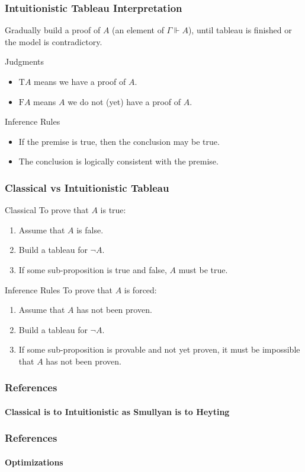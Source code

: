 \documentclass[mathserif]{beamer}
\def\T{\textrm{T}}
\def\F{\textrm{F}}
\newcommand{\diff}[1]{{\color{red} #1}}
\newcommand{\force}[1]{\Gamma \Vdash #1}
\begin{document}
\begin{frame}
\frametitle{Intuitionistic Tableau Interpretation}

Gradually build a proof of $A$ (an element of $\force{A}$),
until tableau is finished or the model is contradictory.

\begin{block}{Judgments}
\begin{itemize}
\item $\T A$ means we have a proof of $A$.
\item $\F A$ means $A$ we do not (yet) have a proof of $A$.
\end{itemize}
\end{block}

\begin{block}{Inference Rules}
\begin{itemize}
\item If the premise is true, then the conclusion \diff{may} be true.
\item The conclusion is logically consistent with the premise.
\end{itemize}
\end{block}

\end{frame}


\begin{frame}
\frametitle{Classical vs Intuitionistic Tableau}

\begin{block}{Classical}
To prove that $A$ is true:
\begin{enumerate}
\item Assume that $A$ is false.
\item Build a tableau for $\neg A$.
\item If some sub-proposition is true and false, $A$ must be true.
\end{enumerate}
\end{block}

\begin{block}{Inference Rules}
To prove that $A$ is forced:
\begin{enumerate}
\item Assume that $A$ has not been proven.
\item Build a tableau for $\neg A$.
\item If some sub-proposition is provable and not yet proven,
it must be impossible that $A$ has not been proven.
\end{enumerate}
\end{block}

\end{frame}

\begin{frame}
\frametitle{References}
\framesubtitle{Classical is to Intuitionistic as Smullyan is to Heyting}

\end{frame}

\begin{frame}
\frametitle{References}
\framesubtitle{Optimizations}

\end{frame}
\end{document}
